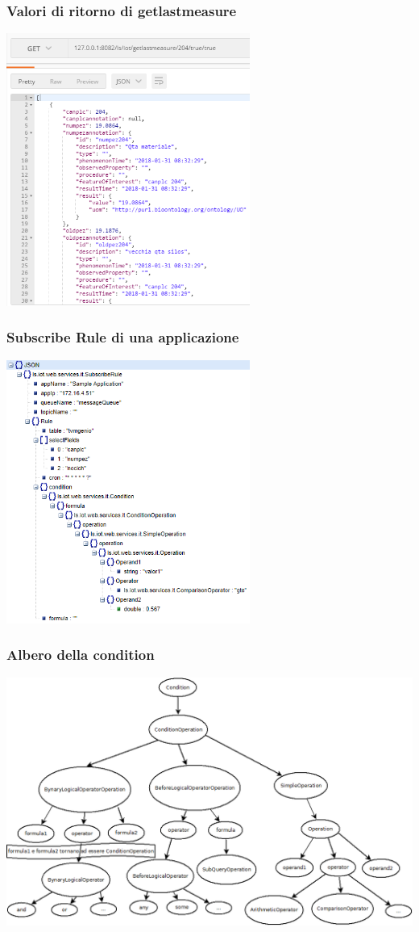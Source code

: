 \documentclass{beamer}
\begin{document}
\begin{frame}
\frametitle{Valori di ritorno di getlastmeasure}
\includegraphics[width=0.6\textwidth]{images/Postman1.png}
\end{frame}

\begin{frame}
\frametitle{Subscribe Rule di una applicazione}
\includegraphics[width=0.6\textwidth]{images/subscribe-json-1.png}
\end{frame}

\begin{frame}
\frametitle{Albero della condition}
\includegraphics[width=1\textwidth]{images/strutturaquerytree.png}
\end{frame}
\end{document}
